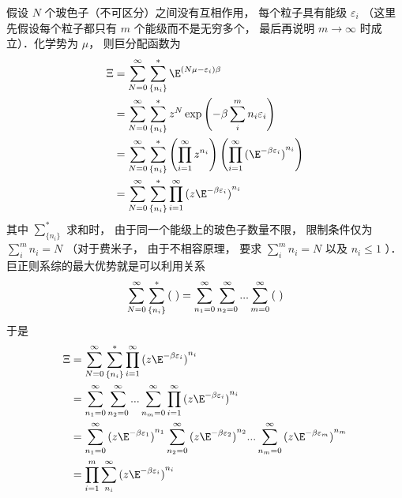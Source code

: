 
假设 $N$ 个玻色子（不可区分）之间没有互相作用， 每个粒子具有能级 ${\varepsilon_i}$ （这里先假设每个粒子都只有 $m$ 个能级而不是无穷多个， 最后再说明 $m \to \infty $ 时成立）．化学势为 $\mu $，  则巨分配函数为
\begin{equation}
  \begin{aligned}
\Xi & = \sum\limits_{N = 0}^\infty  {\sum\limits_{\{ {n_i}\} }^ *  {\E^{(N\mu  - {\varepsilon_i})\beta }} }  \\
& = \sum\limits_{N = 0}^\infty  {\sum\limits_{\{ {n_i}\} }^ *  {{z^N}\exp \left( { - \beta \sum\limits_i^m {{n_i}{\varepsilon_i}} } \right)} }  \\
& = \sum\limits_{N = 0}^\infty  {\sum\limits_{\{ {n_i}\} }^ *  {\left( {\prod\limits_{i = 1}^\infty  {z^{n_i}} } \right)\left( {\prod\limits_{i = 1}^\infty  {{({\E^{ - \beta {\varepsilon_i}}})}^{n_i}} } \right)} } \\
& = \sum\limits_{N = 0}^\infty  {\sum\limits_{\{ {n_i}\} }^ *  {\prod\limits_{i = 1}^\infty  {{(z{\E^{ - \beta {\varepsilon_i}}})}^{n_i}} } }
\end{aligned}
\end{equation}
其中 $\sum\limits_{\{ {n_i}\} }^ *  {} $ 求和时， 由于同一个能级上的玻色子数量不限， 限制条件仅为 $\sum\limits_i^m {n_i}  = N$ （对于费米子， 由于不相容原理， 要求 $\sum\limits_i^m {n_i}  = N$ 以及 ${n_i} \le 1$ ）．\\
巨正则系综的最大优势就是可以利用关系
\begin{equation}
  \sum\limits_{N = 0}^\infty  {\sum\limits_{\{ {n_i}\} }^ *  {({\kern 1pt} {\kern 1pt} {\kern 1pt} )} }  = \sum\limits_{{n_1} = 0}^\infty  {\sum\limits_{{n_2} = 0}^\infty  {...\sum\limits_{m = 0}^\infty  {({\kern 1pt} {\kern 1pt} {\kern 1pt} )} } } 
\end{equation}
于是
\begin{equation}
  \begin{aligned}
\Xi & = \sum\limits_{N = 0}^\infty  {\sum\limits_{\{ {n_i}\} }^ *  {\prod\limits_{i = 1}^\infty  {{(z{\E^{ - \beta {\varepsilon_i}}})}^{n_i}} } }  \\
& = \sum\limits_{{n_1} = 0}^\infty  {\sum\limits_{{n_2} = 0}^\infty  {...\sum\limits_{{n_m} = 0}^\infty  {\prod\limits_{i = 1}^\infty  {{(z{\E^{ - \beta {\varepsilon_i}}})}^{n_i}} } } }  \\
& = \sum\limits_{{n_1} = 0}^\infty  {{{(z{\E^{ - \beta {\varepsilon_1}}})}^{n_1}}\sum\limits_{{n_2} = 0}^\infty  {{{(z{\E^{ - \beta {\varepsilon_2}}})}^{n_2}}...\sum\limits_{{n_m} = 0}^\infty  {{(z{\E^{ - \beta {\varepsilon_m}}})}^{n_m}} } } \\
& = \prod\limits_{i = 1}^m {\sum\limits_{n_i}^\infty  {{(z{\E^{ - \beta {\varepsilon_i}}})}^{n_i}} }
\end{aligned}
\end{equation}
